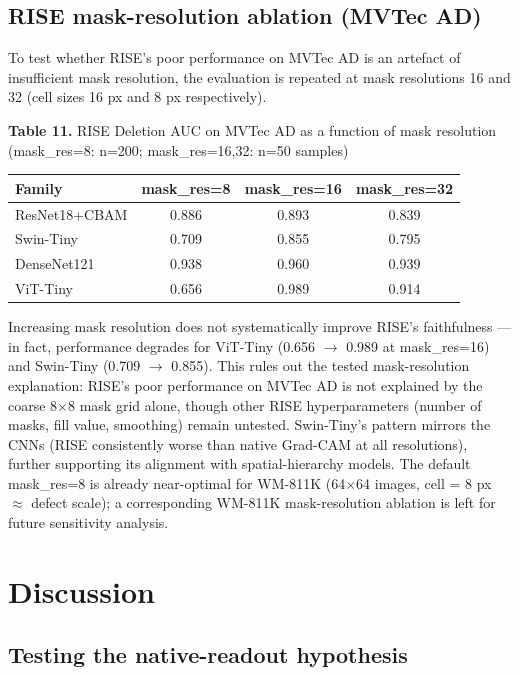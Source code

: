 \documentclass[11pt,a4paper]{article}
\begin{document}
\subsection{RISE mask-resolution ablation (MVTec AD)}

To test whether RISE's poor performance on MVTec AD is an artefact of insufficient mask resolution, the evaluation is repeated at mask resolutions 16 and 32 (cell sizes 16 px and 8 px respectively).

\begin{center}
\small \textbf{Table 11.} RISE Deletion AUC on MVTec AD as a function of mask resolution (mask\_res=8: n=200; mask\_res=16,32: n=50 samples)
\end{center}

\begin{tabular}{lccc}
\toprule
Family & mask\_res=8 & mask\_res=16 & mask\_res=32 \\
\midrule
ResNet18+CBAM & 0.886 & 0.893 & 0.839 \\
Swin-Tiny & 0.709 & 0.855 & 0.795 \\
DenseNet121 & 0.938 & 0.960 & 0.939 \\
ViT-Tiny & 0.656 & 0.989 & 0.914 \\
\bottomrule
\end{tabular}


Increasing mask resolution does not systematically improve RISE's faithfulness --- in fact, performance degrades for ViT-Tiny (0.656 $\rightarrow$ 0.989 at mask\_res=16) and Swin-Tiny (0.709 $\rightarrow$ 0.855). This rules out the tested mask-resolution explanation: RISE's poor performance on MVTec AD is not explained by the coarse 8$\times$8 mask grid alone, though other RISE hyperparameters (number of masks, fill value, smoothing) remain untested. Swin-Tiny's pattern mirrors the CNNs (RISE consistently worse than native Grad-CAM at all resolutions), further supporting its alignment with spatial-hierarchy models. The default mask\_res=8 is already near-optimal for WM-811K (64$\times$64 images, cell = 8 px $\approx$ defect scale); a corresponding WM-811K mask-resolution ablation is left for future sensitivity analysis.


\section{Discussion}

\subsection{Testing the native-readout hypothesis}
\end{document}

